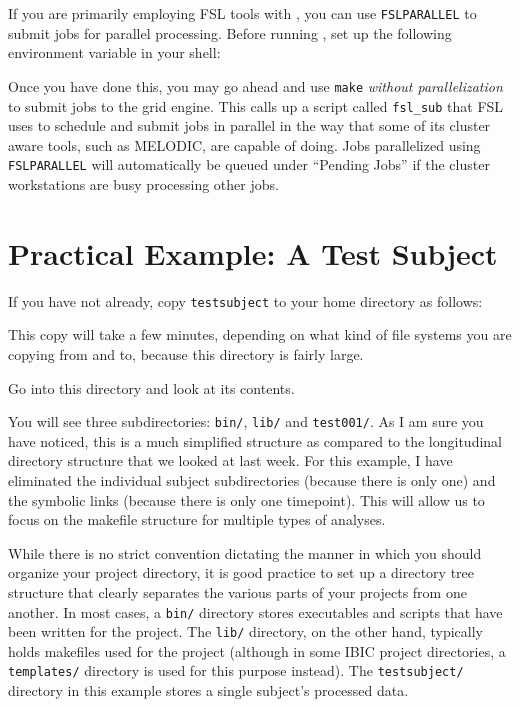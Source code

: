 If you are primarily employing FSL tools with \maken, you can use \texttt{FSLPARALLEL} to submit jobs for parallel processing. Before running \maken, set up the following environment variable in your shell:

Once you have done this, you may go ahead and use \texttt{make} \emph{without parallelization} to submit jobs to the grid engine. This calls up a script called \texttt{fsl_sub} that FSL uses to schedule and submit jobs in parallel in the way that some of its cluster aware tools, such as MELODIC, are capable of doing. Jobs parallelized using \texttt{FSLPARALLEL} will automatically be queued under ``Pending Jobs'' if the cluster workstations are busy processing other jobs. 

\section{Practical Example: A Test Subject}
If you have not already, copy \texttt{testsubject} to your home directory as follows:

This copy will take a few minutes, depending on what kind of file systems you are copying from and to, because this directory is fairly large.

Go into this directory and look at its contents.

You will see three subdirectories: \texttt{bin/}, \texttt{lib/} and \texttt{test001/}. 
As I am sure you have noticed, this is a much simplified structure as compared to the longitudinal directory structure that we looked at last week. For this example, I have eliminated the individual subject subdirectories (because there is only one) and the symbolic links (because there is only one timepoint). This will allow us to focus on the makefile structure for multiple types of analyses. 

While there is no strict convention dictating the manner in which you should organize your project directory, it is good practice to set up a directory tree structure that clearly separates the various parts of your projects from one another. In most cases, a \texttt{bin/} directory stores executables and scripts that have been written for the project. The \texttt{lib/} directory, on the other hand, typically holds makefiles used for the project (although in some IBIC project directories, a \texttt{templates/} directory is used for this purpose instead). The \texttt{testsubject/} directory in this example stores a single subject's processed data.

